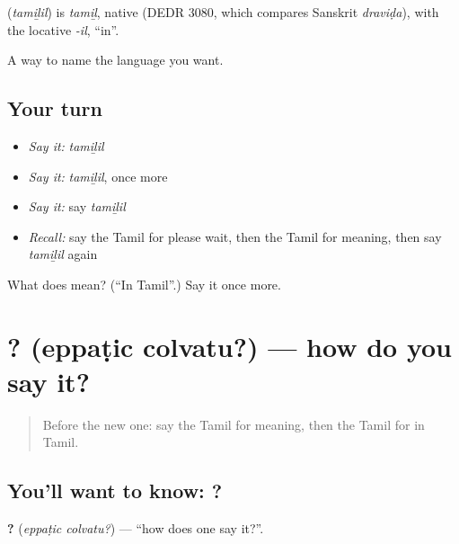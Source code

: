 \begin{cousinweb}
\textbf{} (\emph{tamiḻil}) is \emph{tamiḻ}, native (DEDR 3080, which compares Sanskrit \emph{draviḍa}), with the locative \emph{-il}, \textquotedblleft{}in\textquotedblright{}.
\end{cousinweb}

\begin{grammarlens}[title={What you've built}]
A way to name the language you want.
\end{grammarlens}

\subsection*{Your turn}
\begin{itemize}
\raggedright
  \item \emph{Say it:} \emph{tamiḻil}
  \item \emph{Say it:} \emph{tamiḻil}, once more
  \item \emph{Say it:} say \emph{tamiḻil}
  \item \emph{Recall:} say the Tamil for please wait, then the Tamil for meaning, then say \emph{tamiḻil} again
\end{itemize}

\begin{tcolorbox}[breakable,colback=teal!4,colframe=teal!35!black,title={Before you move on}]
What does  mean? (\textquotedblleft{}In Tamil\textquotedblright{}.) Say it once more.
\end{tcolorbox}
\section[\texorpdfstring{\ta{எப்படிச்} \ta{சொல்வது}? (eppaṭic colvatu?)}{எப்படிச் சொல்வது? (eppaṭic colvatu?)}]{ ? (eppaṭic colvatu?) — how do you say it?}

\label{lesson:TA-C93-howsay}



\begin{quote}
Before the new one: say the Tamil for meaning, then the Tamil for in Tamil.
\end{quote}

\subsection*{You'll want to know:  ?}
\textbf{ ?} (\emph{eppaṭic colvatu?}) — \textquotedblleft{}how does one say it?\textquotedblright{}.

